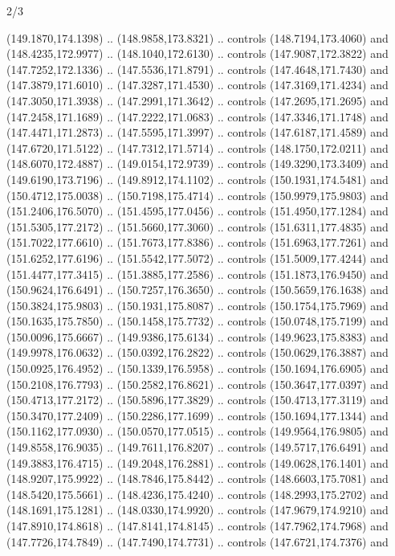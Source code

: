 \begin{flagdescription}{2/3}
\begin{scope}[shift={(0.5\flaglength,0.5)},scale=\flagwidth/320]
\begin{scope}[y=0.8pt, x=0.8pt, yscale=-1,shift={(-118.3,-146)}]
  (149.1870,174.1398) .. (148.9858,173.8321) .. controls (148.7194,173.4060) and
  (148.4235,172.9977) .. (148.1040,172.6130) .. controls (147.9087,172.3822) and
  (147.7252,172.1336) .. (147.5536,171.8791) .. controls (147.4648,171.7430) and
  (147.3879,171.6010) .. (147.3287,171.4530) .. controls (147.3169,171.4234) and
  (147.3050,171.3938) .. (147.2991,171.3642) .. controls (147.2695,171.2695) and
  (147.2458,171.1689) .. (147.2222,171.0683) .. controls (147.3346,171.1748) and
  (147.4471,171.2873) .. (147.5595,171.3997) .. controls (147.6187,171.4589) and
  (147.6720,171.5122) .. (147.7312,171.5714) .. controls (148.1750,172.0211) and
  (148.6070,172.4887) .. (149.0154,172.9739) .. controls (149.3290,173.3409) and
  (149.6190,173.7196) .. (149.8912,174.1102) .. controls (150.1931,174.5481) and
  (150.4712,175.0038) .. (150.7198,175.4714) .. controls (150.9979,175.9803) and
  (151.2406,176.5070) .. (151.4595,177.0456) .. controls (151.4950,177.1284) and
  (151.5305,177.2172) .. (151.5660,177.3060) .. controls (151.6311,177.4835) and
  (151.7022,177.6610) .. (151.7673,177.8386) .. controls (151.6963,177.7261) and
  (151.6252,177.6196) .. (151.5542,177.5072) .. controls (151.5009,177.4244) and
  (151.4477,177.3415) .. (151.3885,177.2586) .. controls (151.1873,176.9450) and
  (150.9624,176.6491) .. (150.7257,176.3650) .. controls (150.5659,176.1638) and
  (150.3824,175.9803) .. (150.1931,175.8087) .. controls (150.1754,175.7969) and
  (150.1635,175.7850) .. (150.1458,175.7732) .. controls (150.0748,175.7199) and
  (150.0096,175.6667) .. (149.9386,175.6134) .. controls (149.9623,175.8383) and
  (149.9978,176.0632) .. (150.0392,176.2822) .. controls (150.0629,176.3887) and
  (150.0925,176.4952) .. (150.1339,176.5958) .. controls (150.1694,176.6905) and
  (150.2108,176.7793) .. (150.2582,176.8621) .. controls (150.3647,177.0397) and
  (150.4713,177.2172) .. (150.5896,177.3829) .. controls (150.4713,177.3119) and
  (150.3470,177.2409) .. (150.2286,177.1699) .. controls (150.1694,177.1344) and
  (150.1162,177.0930) .. (150.0570,177.0515) .. controls (149.9564,176.9805) and
  (149.8558,176.9035) .. (149.7611,176.8207) .. controls (149.5717,176.6491) and
  (149.3883,176.4715) .. (149.2048,176.2881) .. controls (149.0628,176.1401) and
  (148.9207,175.9922) .. (148.7846,175.8442) .. controls (148.6603,175.7081) and
  (148.5420,175.5661) .. (148.4236,175.4240) .. controls (148.2993,175.2702) and
  (148.1691,175.1281) .. (148.0330,174.9920) .. controls (147.9679,174.9210) and
  (147.8910,174.8618) .. (147.8141,174.8145) .. controls (147.7962,174.7968) and
  (147.7726,174.7849) .. (147.7490,174.7731) .. controls (147.6721,174.7376) and

\end{scope}
\end{scope}
\end{flagdescription}
